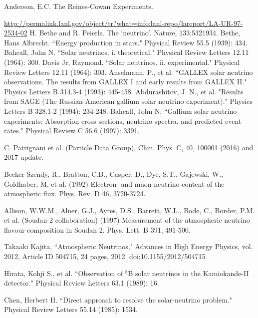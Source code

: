 \documentclass[preprint,12pt]{elsarticle}
\begin{document}
\vspace{30mm}


\begin{thebibliography}{00}
 Anderson, E.C. The Reines-Cowan Experiments. 

\url{http://permalink.lanl.gov/object/tr?what=info:lanl-repo/lareport/LA-UR-97-2534-02}
 H. Bethe and R. Peierls. The `neutrino'. Nature, 133:5321934.
 Bethe, Hans Albrecht. ``Energy production in stars." Physical Review 55.5 (1939): 434.
 Bahcall, John N. ``Solar neutrinos. i. theoretical." Physical Review Letters 12.11 (1964): 300.
 Davis Jr, Raymond. ``Solar neutrinos. ii. experimental." Physical Review Letters 12.11 (1964): 303.
 Anselmann, P., et al. ``GALLEX solar neutrino observations. The results from GALLEX I and early results from GALLEX II." Physics Letters B 314.3-4 (1993): 445-458.
 Abdurashitov, J. N., et al. "Results from SAGE (The Russian-American gallium solar neutrino experiment)." Physics Letters B 328.1-2 (1994): 234-248.
 Bahcall, John N. ``Gallium solar neutrino experiments: Absorption cross sections, neutrino spectra, and predicted event rates." Physical Review C 56.6 (1997): 3391.

 C. Patrignani et al. (Particle Data Group), Chin. Phys. C, 40, 100001 (2016) and 2017 update.

 Becker-Szendy, R., Bratton, C.B., Casper, D., Dye, S.T., Gajewski, W., Goldhaber, M. et al. (1992) Electron- and muon-neutrino content of the atmospheric flux. Phys. Rev. D 46, 3720-3724.

 Allison, W.W.M., Alner, G.J., Ayres, D.S., Barrett, W.L., Bode, C., Border, P.M. et al. (Soudan-2 collaboration) (1997) Measurement of the atmospheric neutrino flavour composition in Soudan 2. Phys. Lett. B 391, 491-500.

 Takaaki Kajita, ``Atmospheric Neutrinos," Advances in High Energy Physics, vol. 2012, Article ID 504715, 24 pages, 2012. doi:10.1155/2012/504715

 Hirata, Kohji S., et al. ``Observation of $^8$B solar neutrinos in the Kamiokande-II detector." Physical Review Letters 63.1 (1989): 16.

 Chen, Herbert H. ``Direct approach to resolve the solar-neutrino problem." Physical Review Letters 55.14 (1985): 1534.


\end{thebibliography}
\end{document}
